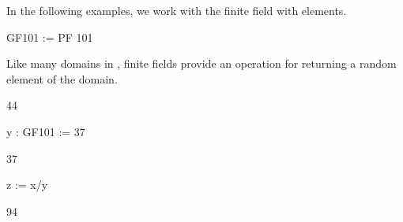 {{{{{{{{{{{{{{{{\begin{xtc}
\begin{xtccomment}
In the following examples, we work with the finite field with
 elements.
\end{xtccomment}
\begin{spadsrc}
GF101 := PF 101 
\end{spadsrc}
\begin{TeXOutput}
\begin{fricasmath}{9}
%
\end{fricasmath}
\end{TeXOutput}
\end{xtc}
\begin{xtc}
\begin{xtccomment}
Like many domains in \Language{}, finite fields provide an operation
for returning a random element of the domain.
\end{xtccomment}
\begin{TeXOutput}
\begin{fricasmath}{10}
44%
\end{fricasmath}
\end{TeXOutput}
\end{xtc}
\begin{xtc}
\begin{xtccomment}
\end{xtccomment}
\begin{spadsrc}
y : GF101 := 37 
\end{spadsrc}
\begin{TeXOutput}
\begin{fricasmath}{11}
37%
\end{fricasmath}
\end{TeXOutput}
\end{xtc}
\begin{xtc}
\begin{xtccomment}
\end{xtccomment}
\begin{spadsrc}
z := x/y 
\end{spadsrc}
\begin{TeXOutput}
\begin{fricasmath}{12}
94%
\end{fricasmath}
\end{TeXOutput}

\end{xtc}}}}}}}}}}}}}}}}}
